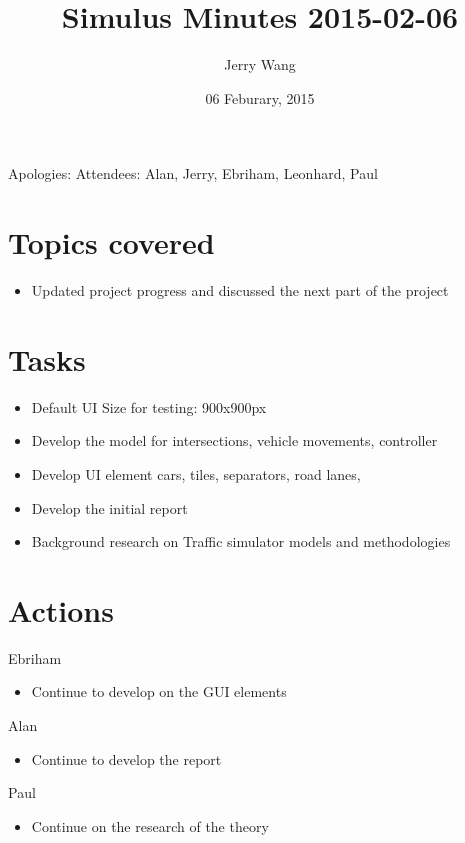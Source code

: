 \documentclass{article}
\author {Jerry Wang}
\title{Simulus Minutes 2015-02-06}
\date {06 Feburary, 2015}
\begin{document}
\maketitle




\noindent Apologies: 
\newline 
Attendees: Alan, Jerry, Ebriham, Leonhard, Paul


\section {Topics covered}
\begin{itemize}
\item  Updated project progress and discussed the next part of the project
\end{itemize}



\section {Tasks}

\begin{itemize}
\item Default UI Size for testing: 900x900px
  \item    Develop the model for intersections, vehicle movements, controller
\item      Develop UI element cars, tiles, separators, road lanes,
\item      Develop the initial report
  \item    Background research on Traffic simulator models and methodologies 

\end{itemize}

\section {Actions}
Ebriham 
\begin{itemize}
\item Continue to develop on the GUI elements
\end{itemize}

\noindent
Alan
\begin{itemize}
\item  Continue to develop the report 
     
\end{itemize}

\noindent
Paul
\begin{itemize}
\item Continue on the research of the theory 
\end{itemize}
\end{document}

